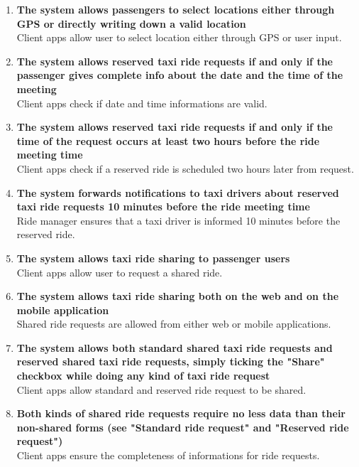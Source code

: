\begin{enumerate}
	\item \textbf{The system allows passengers to select locations either through GPS or directly writing down a valid location}\\
	Client apps allow user to select location either through GPS or user input.
	
	\item \textbf{The system allows reserved taxi ride requests if and only if the passenger gives complete info about the date and the time of the meeting}\\
	Client apps check if date and time informations are valid.
	
	\item \textbf{The system allows reserved taxi ride requests if and only if the time of the request occurs at least two hours before the ride meeting time}\\
	Client apps check if a reserved ride is scheduled two hours later from request.
	
	\item \textbf{The system forwards notifications to taxi drivers about reserved taxi ride requests 10 minutes before the ride meeting time}\\
	Ride manager ensures that a taxi driver is informed 10 minutes before the reserved ride.
	
	\item \textbf{The system allows taxi ride sharing to passenger users}\\
	Client apps allow user to request a shared ride.
	
	\item \textbf{The system allows taxi ride sharing both on the web and on the mobile application}\\
	Shared ride requests are allowed from either web or mobile applications.
	
	\item \textbf{The system allows both standard shared taxi ride requests and reserved shared taxi ride requests, simply ticking the "Share" checkbox while doing any kind of taxi ride request}\\
	Client apps allow standard and reserved ride request to be shared.
	
	\item \textbf{Both kinds of shared ride requests require no less data than their non-shared forms (see "Standard ride request" and "Reserved ride request")}\\
	Client apps ensure the completeness of informations for ride requests.
	

\end{enumerate}
